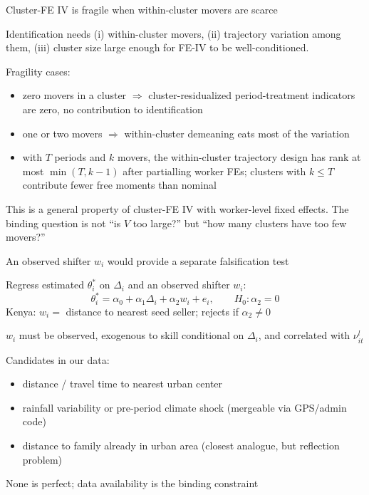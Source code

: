 \documentclass[10pt,aspectratio=169]{beamer}
\newcommand{\thetai}{\theta_{i}}
\newcommand{\Deltai}{\Delta_{i}}
\newcommand{\nuil}{\nu_{it}^{l}}
\begin{document}
\begin{frame}{Cluster-FE IV is fragile when within-cluster movers are scarce}

  Identification needs (i) within-cluster movers, (ii) trajectory variation among them, (iii) cluster size large enough for FE-IV to be well-conditioned.

  \vspace{0.4em}
  Fragility cases:
  \begin{itemize}
    \item zero movers in a cluster $\Rightarrow$ cluster-residualized period-treatment indicators are zero, no contribution to identification
    \item one or two movers $\Rightarrow$ within-cluster demeaning eats most of the variation
    \item with $T$ periods and $k$ movers, the within-cluster trajectory design has rank at most $\min(T, k-1)$ after partialling worker FEs; clusters with $k \le T$ contribute fewer free moments than nominal
  \end{itemize}

  \vspace{0.4em}
  This is a general property of cluster-FE IV with worker-level fixed effects.
  The binding question is not ``is $V$ too large?'' but ``how many clusters have too few movers?''

\end{frame}

\begin{frame}{An observed shifter $w_i$ would provide a separate falsification test}

  Regress estimated $\thetai^{*}$ on $\Deltai$ and an observed shifter $w_i$:
  \[
    \thetai^{*} = \alpha_0 + \alpha_1 \Deltai + \alpha_2 w_i + e_i,
    \qquad H_0: \alpha_2 = 0
  \]
  Kenya: $w_i = $ distance to nearest seed seller; rejects if $\alpha_2 \neq 0$

  \vspace{0.5em}
  $w_i$ must be observed, exogenous to skill conditional on $\Deltai$, and correlated with $\nuil$

  \vspace{0.5em}
  Candidates in our data:
  \begin{itemize}
    \item distance / travel time to nearest urban center
    \item rainfall variability or pre-period climate shock (mergeable via GPS/admin code)
    \item distance to family already in urban area (closest analogue, but reflection problem)
  \end{itemize}

  \vspace{0.3em}
  None is perfect; data availability is the binding constraint

\end{frame}
\end{document}
